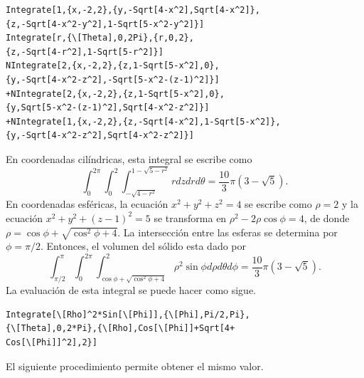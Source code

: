 \begin{tcolorbox}[title=\bf Instrucción en \verb"Mathematica"]\begin{Verbatim}[formatcom=\letraverbatim]
Integrate[1,{x,-2,2},{y,-Sqrt[4-x^2],Sqrt[4-x^2]},
{z,-Sqrt[4-x^2-y^2],1-Sqrt[5-x^2-y^2]}]
Integrate[r,{\[Theta],0,2Pi},{r,0,2},
{z,-Sqrt[4-r^2],1-Sqrt[5-r^2]}]
NIntegrate[2,{x,-2,2},{z,1-Sqrt[5-x^2],0},
{y,-Sqrt[4-x^2-z^2],-Sqrt[5-x^2-(z-1)^2]}]
+NIntegrate[2,{x,-2,2},{z,1-Sqrt[5-x^2],0},
{y,Sqrt[5-x^2-(z-1)^2],Sqrt[4-x^2-z^2]}]
+NIntegrate[1,{x,-2,2},{z,-Sqrt[4-x^2],1-Sqrt[5-x^2]},
{y,-Sqrt[4-x^2-z^2],Sqrt[4-x^2-z^2]}]
\end{Verbatim}
\end{tcolorbox}

En coordenadas cilíndricas, esta integral se escribe como
%
\[\int_{0}^{2\pi }\int_{0}^{2}\int_{-\sqrt{4-r^{2}}}^{1-\sqrt{5-r^{2}}}rdzdrd\theta=\frac{10}{3}\pi\left(3-\sqrt{5}\right)\!.\]
%
En coordenadas esféricas, la ecuación $x^{2}+y^{2}+z^{2}=4$ se escribe como $\rho =2$ y la ecuación
$x^{2}+y^{2}+\left( z-1\right) ^{2}=5$ se transforma en $\rho ^{2}-2\rho \cos \phi=4$, de donde
$\rho =\cos \phi +\sqrt{\cos ^{2}\phi +4}$.
La intersección entre las esferas se determina por $\phi = \pi /2$.
Entonces, el volumen del sólido esta dado por
%
\[\int_{\pi /2}^{\pi }\int_{0}^{2\pi }\int_{\cos \phi +\sqrt{\cos ^{2}\phi +4}}^{2}\rho ^{2}\sin \phi d\rho d\theta d\phi = \frac{10}{3}\pi \left( 3-\sqrt{5}\right)\!.\]
%
La evaluación de esta integral se puede hacer como sigue.

\begin{tcolorbox}[title=\bf Instrucción en \verb"Mathematica"]\begin{Verbatim}[formatcom=\letraverbatim]
Integrate[\[Rho]^2*Sin[\[Phi]],{\[Phi],Pi/2,Pi},
{\[Theta],0,2*Pi},{\[Rho],Cos[\[Phi]]+Sqrt[4+
Cos[\[Phi]]^2],2}]
\end{Verbatim}
\end{tcolorbox}

El siguiente procedimiento permite obtener el mismo valor.

